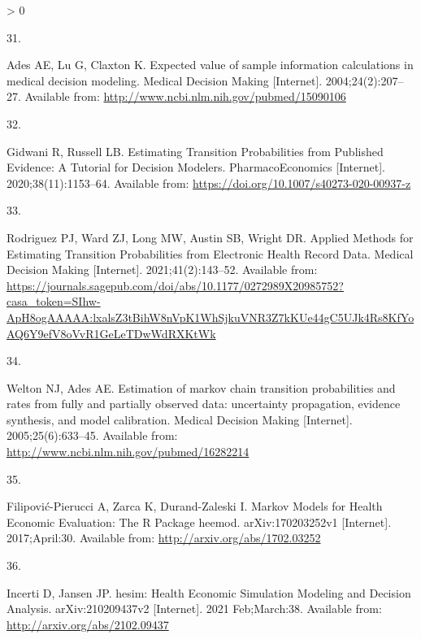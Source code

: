 \documentclass[
]{article}
\newlength{\cslhangindent}
\newlength{\csllabelwidth}
\newenvironment{CSLReferences}[2] %
 {%
  \setlength{\parindent}{0pt}
  \ifodd #1 \everypar{\setlength{\hangindent}{\cslhangindent}}\ignorespaces\fi
  \ifnum #2 > 0
  \setlength{\parskip}{#2\baselineskip}
  \fi
 }%
 {}
\newcommand{\CSLLeftMargin}[1]{\parbox[t]{\csllabelwidth}{#1}}
\newcommand{\CSLRightInline}[1]{\parbox[t]{\linewidth - \csllabelwidth}{#1}\break}
\begin{document}
\begin{CSLReferences}{0}{0}
\leavevmode\hypertarget{ref-Ades2004a}{}%
\CSLLeftMargin{31. }
\CSLRightInline{Ades AE, Lu G, Claxton K. {Expected value of sample information calculations in medical decision modeling.} Medical Decision Making {[}Internet{]}. 2004;24(2):207--27. Available from: \url{http://www.ncbi.nlm.nih.gov/pubmed/15090106}}

\leavevmode\hypertarget{ref-Gidwani2020}{}%
\CSLLeftMargin{32. }
\CSLRightInline{Gidwani R, Russell LB. {Estimating Transition Probabilities from Published Evidence: A Tutorial for Decision Modelers}. PharmacoEconomics {[}Internet{]}. 2020;38(11):1153--64. Available from: \url{https://doi.org/10.1007/s40273-020-00937-z}}

\leavevmode\hypertarget{ref-Rodriguez2021}{}%
\CSLLeftMargin{33. }
\CSLRightInline{Rodriguez PJ, Ward ZJ, Long MW, Austin SB, Wright DR. {Applied Methods for Estimating Transition Probabilities from Electronic Health Record Data}. Medical Decision Making {[}Internet{]}. 2021;41(2):143--52. Available from: \url{https://journals.sagepub.com/doi/abs/10.1177/0272989X20985752?casa_token=SIhw-ApH8ogAAAAA:lxalsZ3tBihW8nVpK1WhSjkuVNR3Z7kKUe44gC5UJk4Rs8KfYoAQ6Y9efV8oVvR1GeLeTDwWdRXKtWk}}

\leavevmode\hypertarget{ref-Welton2005}{}%
\CSLLeftMargin{34. }
\CSLRightInline{Welton NJ, Ades AE. {Estimation of markov chain transition probabilities and rates from fully and partially observed data: uncertainty propagation, evidence synthesis, and model calibration.} Medical Decision Making {[}Internet{]}. 2005;25(6):633--45. Available from: \url{http://www.ncbi.nlm.nih.gov/pubmed/16282214}}

\leavevmode\hypertarget{ref-Filipovic-Pierucci2017}{}%
\CSLLeftMargin{35. }
\CSLRightInline{Filipović-Pierucci A, Zarca K, Durand-Zaleski I. {Markov Models for Health Economic Evaluation: The R Package heemod}. arXiv:170203252v1 {[}Internet{]}. 2017;April:30. Available from: \url{http://arxiv.org/abs/1702.03252}}

\leavevmode\hypertarget{ref-Incerti2021}{}%
\CSLLeftMargin{36. }
\CSLRightInline{Incerti D, Jansen JP. {hesim: Health Economic Simulation Modeling and Decision Analysis}. arXiv:210209437v2 {[}Internet{]}. 2021 Feb;March:38. Available from: \url{http://arxiv.org/abs/2102.09437}}

\end{CSLReferences}
\end{document}

